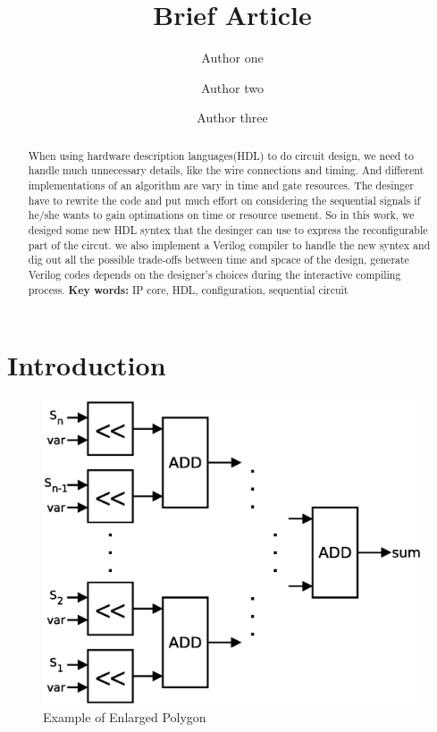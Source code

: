 \documentclass[11pt]{article} %
\title{Brief Article}
\author{Author one\and Author two\and Author three}
\begin{document}
\maketitle

\begin{abstract}
When using hardware description languages(HDL) to do circuit design, we need to handle much unnecessary details, like the wire connections and timing. And different implementations of an algorithm are vary in time and gate resources. The  desinger have to rewrite the code and put much effort on considering the sequential signals if he/she wants to gain optimations on time or resource usement. So in this work, we desiged some new HDL syntex that the desinger can use to express the reconfigurable part of the circut. we also implement a Verilog compiler to handle the new syntex and dig out all the possible trade-offs between time and spcace of the design, generate Verilog codes depends on the designer's choices during the interactive compiling process.\newline\newline
\textbf{Key words: }IP core, HDL, configuration, sequential circuit
\end{abstract}



\section{Introduction}

\begin{figure}
\centering
\includegraphics{fold}
\caption{Example of Enlarged Polygon}
\label{fig:10}
\end{figure}
\end{document}
